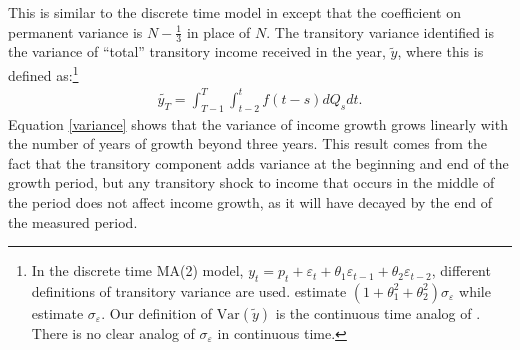 \documentclass[titlepage]{\econtex}\newcommand{\texname}{ConsumptionHeterogeneity}
\begin{document}
	This is similar to the discrete time model in \cite{carroll_nature_1997} except that the coefficient on permanent variance is $N-\frac{1}{3}$ in place of $N$. The transitory variance identified is the variance of ``total'' transitory income received in the year, $\tilde{y}$, where this is defined as:\footnote{In the discrete time MA(2) model, $y_t = p_t + \varepsilon_t + \theta_1 \varepsilon_{t-1} + \theta_2 \varepsilon_{t-2}$, different definitions of transitory variance are used. \cite{carroll_nature_1997} estimate $(1+\theta_1^2 + \theta_2^2)\sigma_{\varepsilon}$ while \cite{blundell_consumption_2008} estimate $\sigma_{\varepsilon}$. Our definition of $\mathrm{Var}(\tilde{y})$ is the continuous time analog of \cite{carroll_nature_1997}. There is no clear analog of $\sigma_{\varepsilon}$ in continuous time.}
	\begin{align}
	\tilde{y_T} = \int_{T-1}^{T}\int_{t-2}^{t} f(t-s)dQ_s dt \text{.}\label{tot_income}
	\end{align}
	Equation \ref{variance} shows that the variance of income growth grows linearly with the number of years of growth beyond three years. This result comes from the fact that the transitory component adds variance at the beginning and end of the growth period, but any transitory shock to income that occurs in the middle of the period does not affect income growth, as it will have decayed by the end of the measured period.
	
\end{document}
